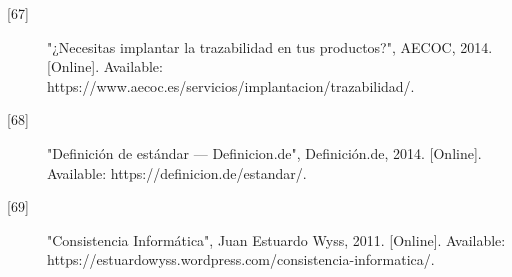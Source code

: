 \begin{description}
		\item[\hypertarget{b67}{[67]}] "¿Necesitas implantar la trazabilidad en tus productos?", AECOC, 2014. [Online]. Available: https://www.aecoc.es/servicios/implantacion/trazabilidad/. 
		
		\item[\hypertarget{b68}{[68]}] "Definición de estándar — Definicion.de", Definición.de, 2014. [Online]. Available: https://definicion.de/estandar/. 
		
		\item[\hypertarget{b69}{[69]}] "Consistencia Informática", Juan Estuardo Wyss, 2011. [Online]. Available: https://estuardowyss.wordpress.com/consistencia-informatica/. 
\end{description}